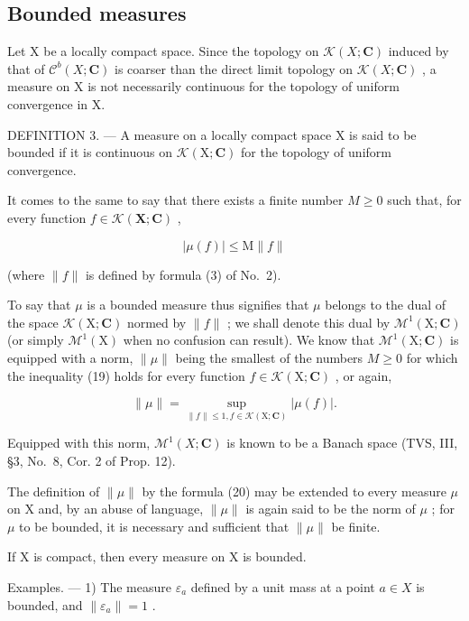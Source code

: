 \subsection{Bounded measures}

Let X be a locally compact space. Since the topology on \(\mathcal{K}(X;\mathbf{C})\) induced by that of \(\mathcal{C}^{b}(X;\mathbf{C})\) is coarser than the direct limit topology on \(\mathcal{K}(X;\mathbf{C})\) , a measure on X is not necessarily continuous for the topology of uniform convergence in X.

DEFINITION 3. --- A measure on a locally compact space X is said to be bounded if it is continuous on \(\mathcal{K}(\mathrm{X};\mathbf{C})\) for the topology of uniform convergence.

It comes to the same to say that there exists a finite number \(M \geqslant 0\) such that, for every function \(f \in \mathcal{K}(\mathbf{X}; \mathbf{C})\) ,

\[
| \mu (f) | \leqslant \mathrm{M} \| f \|\tag{19}
\]

(where \(\| f\|\) is defined by formula (3) of No.~2).

To say that \(\mu\) is a bounded measure thus signifies that \(\mu\) belongs to the dual of the space \(\mathcal{K}(\mathrm{X};\mathbf{C})\) normed by \(\| f\|\) ; we shall denote this dual by \(\mathcal{M}^1 (\mathrm{X};\mathbf{C})\) (or simply \(\mathcal{M}^1 (\mathrm{X})\) when no confusion can result). We know that \(\mathcal{M}^1 (\mathrm{X};\mathbf{C})\) is equipped with a norm, \(\| \mu \|\) being the smallest of the numbers \(M\geqslant 0\) for which the inequality (19) holds for every function \(f\in \mathcal{K}(\mathrm{X};\mathbf{C})\) , or again,

\[
\| \mu \| = \sup _ {\| f \| \leqslant 1, f \in \mathcal{K} (\mathrm{X}; \mathbf {C})} | \mu (f) |.\tag{20}
\]

Equipped with this norm, \(\mathcal{M}^{1}(X;\mathbf{C})\) is known to be a Banach space (TVS, III, §3, No.~8, Cor. 2 of Prop. 12).

The definition of \(\|\mu\|\) by the formula (20) may be extended to every measure \(\mu\) on X and, by an abuse of language, \(\|\mu\|\) is again said to be the norm of \(\mu\) ; for \(\mu\) to be bounded, it is necessary and sufficient that \(\|\mu\|\) be finite.

If X is compact, then every measure on X is bounded.

Examples. --- 1) The measure \(\varepsilon_{a}\) defined by a unit mass at a point \(a \in X\) is bounded, and \(\| \varepsilon_{a} \| = 1\) .

